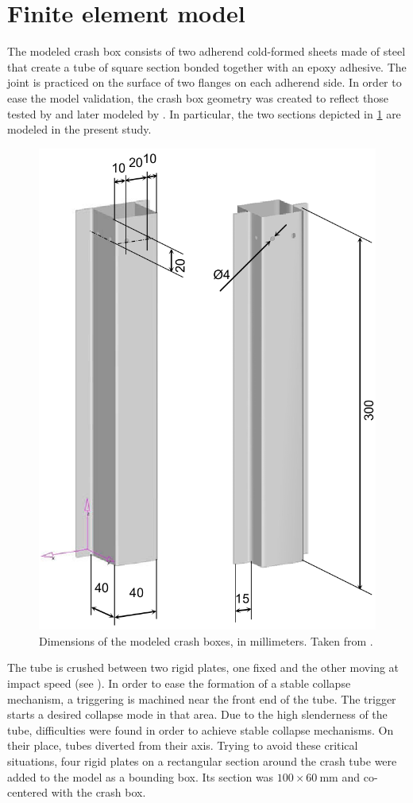 \documentclass[cmfonts]{witpress}
\begin{document}
\section{Finite element model}
The modeled crash box consists of two adherend cold-formed sheets made of steel that create a tube of square section bonded together with an epoxy adhesive. The joint is practiced on the surface of two flanges on each adherend side. In order to ease the model validation, the crash box geometry was created to reflect those tested by \cite{Peroni2009} and later modeled by \cite{Scattina2011}. In particular, the two sections depicted in \cref{fig:crash_box} are modeled in the present study.

\begin{figure}[htpb]
	\centering
	\includegraphics[width=0.5\linewidth]{figures/IMG_CUTRES/medidas_cb}
	\caption{Dimensions of the modeled crash boxes, in millimeters. Taken from \cite{Peroni2009}.}
	\label{fig:crash_box}
\end{figure}


The tube is crushed between two rigid plates, one fixed and the other moving at impact speed (see ). In order to ease the formation of a stable collapse mechanism, a triggering is machined near the front end of the tube. The trigger starts a desired collapse mode in that area. Due to the high slenderness of the tube, difficulties were found in order to achieve stable collapse mechanisms. On their place, tubes diverted from their axis. Trying to avoid these critical situations, four rigid plates on a rectangular section around the crash tube were added to the model as a bounding box. Its section was $\num{100}\times\SI{60}{\mm}$ and co-centered with the crash box.
\end{document}
